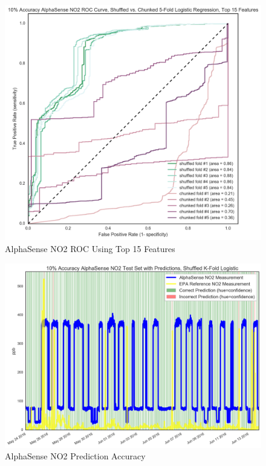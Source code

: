 \begin{figure}[htb]
 	\includegraphics[width=\textwidth]{figs/as_no2_10_roc_pruned_features}               
 	 \caption{AlphaSense NO2 ROC Using Top 15 Features}
  	\label{fig:as_no2_10_roc_pruned_features}
\end{figure}

\begin{figure}[htb]
 	\includegraphics[width=\textwidth]{figs/as_no2_10_logistic_predictions}               
 	 \caption{AlphaSense NO2 Prediction Accuracy}
  	\label{fig:as_no2_10_logistic_predictions}
\end{figure}



